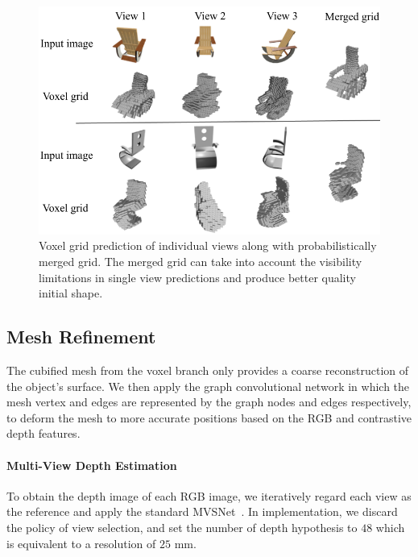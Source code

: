 \begin{figure}[th!]
    \begin{center}
        \includegraphics[width=\linewidth]{imgs/initial_vox.png}
    \end{center}
        \caption{Voxel grid prediction of individual views along with probabilistically merged grid. The merged grid can take into account the visibility limitations in single view predictions and produce better quality initial shape.}
        \label{fig:initial_vox}
\end{figure}

\subsection{Mesh Refinement}
\label{subsec:mesh_refinement}
The cubified mesh from the voxel branch only provides a coarse reconstruction of the object's surface. 
We then apply the graph convolutional network in which the mesh vertex and edges are represented by the graph nodes and edges respectively, to deform the mesh to more accurate positions based on the RGB and contrastive depth features.

\label{subsec:depth_prediction}
\paragraph{Multi-View Depth Estimation}\vspace{-4mm}
To obtain the depth image of each RGB image, we iteratively regard each view as the reference and apply the standard MVSNet~\cite{yao2018mvsnet}.
In implementation, we discard the policy of view selection, and set the number of depth hypothesis to $48$ which is equivalent to a resolution of $25$ mm.

